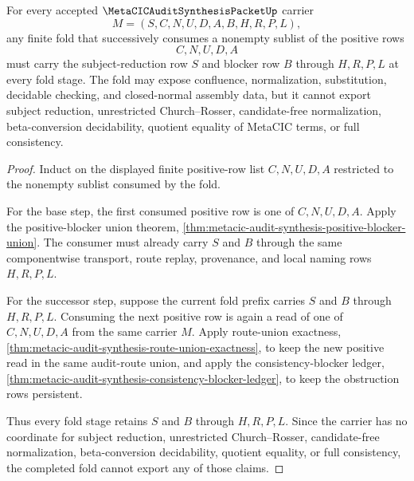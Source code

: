 \begin{theorem}
\label{thm:metacic-audit-synthesis-retained-blocker-induction}
For every accepted $\MetaCICAuditSynthesisPacketUp$ carrier
$$
M=(S,C,N,U,D,A,B,H,R,P,L),
$$
any finite fold that successively consumes a nonempty sublist of the positive rows
$$
C,N,U,D,A
$$
must carry the subject-reduction row $S$ and blocker row $B$ through $H,R,P,L$ at every fold stage. The fold may expose confluence, normalization, substitution, decidable checking, and closed-normal assembly data, but it cannot export subject reduction, unrestricted Church--Rosser, candidate-free normalization, beta-conversion decidability, quotient equality of MetaCIC terms, or full consistency.
\end{theorem}
\begin{proof}
Induct on the displayed finite positive-row list $C,N,U,D,A$ restricted to the nonempty sublist consumed by the fold.

For the base step, the first consumed positive row is one of $C,N,U,D,A$. Apply the positive-blocker union theorem, \autoref{thm:metacic-audit-synthesis-positive-blocker-union}. The consumer must already carry $S$ and $B$ through the same componentwise transport, route replay, provenance, and local naming rows $H,R,P,L$.

For the successor step, suppose the current fold prefix carries $S$ and $B$ through $H,R,P,L$. Consuming the next positive row is again a read of one of $C,N,U,D,A$ from the same carrier $M$. Apply route-union exactness, \autoref{thm:metacic-audit-synthesis-route-union-exactness}, to keep the new positive read in the same audit-route union, and apply the consistency-blocker ledger, \autoref{thm:metacic-audit-synthesis-consistency-blocker-ledger}, to keep the obstruction rows persistent.

Thus every fold stage retains $S$ and $B$ through $H,R,P,L$. Since the carrier has no coordinate for subject reduction, unrestricted Church--Rosser, candidate-free normalization, beta-conversion decidability, quotient equality, or full consistency, the completed fold cannot export any of those claims.
\end{proof}

